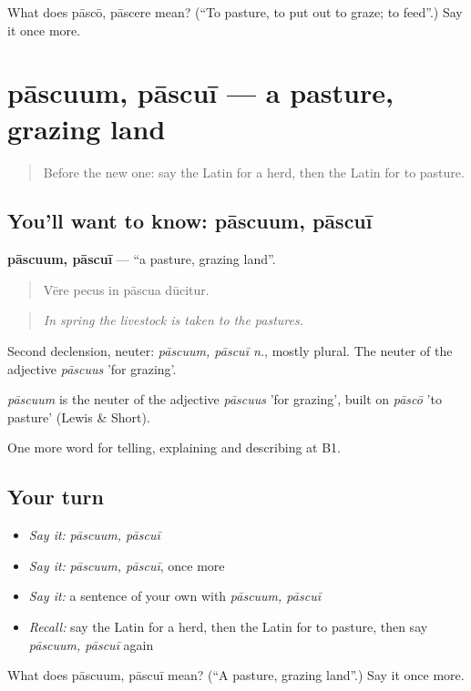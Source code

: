 \begin{tcolorbox}[breakable,colback=teal!4,colframe=teal!35!black,title={Before you move on}]
What does pāscō, pāscere mean? (\textquotedblleft{}To pasture, to put out to graze; to feed\textquotedblright{}.) Say it once more.
\end{tcolorbox}
\section[pāscuum, pāscuī]{pāscuum, pāscuī — a pasture, grazing land}

\label{lesson:LA-C477-pascuum}



\begin{quote}
Before the new one: say the Latin for a herd, then the Latin for to pasture.
\end{quote}

\subsection*{You'll want to know: pāscuum, pāscuī}
\textbf{pāscuum, pāscuī} — \textquotedblleft{}a pasture, grazing land\textquotedblright{}.

\begin{quote}
Vēre pecus in pāscua dūcitur.
\end{quote}

\begin{quote}
\emph{In spring the livestock is taken to the pastures.}
\end{quote}

Second declension, neuter: \emph{pāscuum, pāscuī n.}, mostly plural. The neuter of the adjective \emph{pāscuus} 'for grazing'.

\begin{cousinweb}
\emph{pāscuum} is the neuter of the adjective \emph{pāscuus} 'for grazing', built on \emph{pāscō} 'to pasture' (Lewis \& Short).
\end{cousinweb}

\begin{grammarlens}[title={What you've built}]
One more word for telling, explaining and describing at B1.
\end{grammarlens}

\subsection*{Your turn}
\begin{itemize}
\raggedright
  \item \emph{Say it:} \emph{pāscuum, pāscuī}
  \item \emph{Say it:} \emph{pāscuum, pāscuī}, once more
  \item \emph{Say it:} a sentence of your own with \emph{pāscuum, pāscuī}
  \item \emph{Recall:} say the Latin for a herd, then the Latin for to pasture, then say \emph{pāscuum, pāscuī} again
\end{itemize}

\begin{tcolorbox}[breakable,colback=teal!4,colframe=teal!35!black,title={Before you move on}]
What does pāscuum, pāscuī mean? (\textquotedblleft{}A pasture, grazing land\textquotedblright{}.) Say it once more.
\end{tcolorbox}
